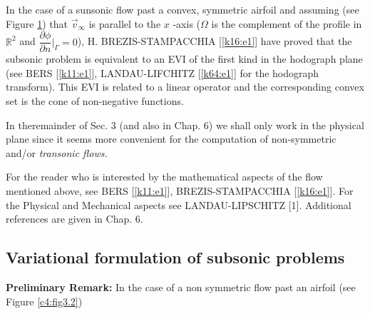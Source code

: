 \begin{remark}\label{c4:rem3.1}%
In the case of a sunsonic flow past a convex, symmetric airfoil and
assuming (see Figure \ref{c4:fig3.1}) that $\vec{v}_\infty$ is
parallel to the $x$ 
-axis ($\Omega$ is the complement of the profile in $\mathbb{R}^2$ and
$\dfrac{\partial \phi}{\partial n}|_\Gamma = 0$),
H. BREZIS-STAMPACCHIA [\ref{k16:e1}] have proved that the subsonic problem is
equivalent to an EVI of the first kind in the hodograph plane (see
BERS [\ref{k11:e1}], LANDAU-LIFCHITZ [\ref{k64:e1}] for the hodograph
transform). This EVI 
is related to a linear operator and the corresponding convex set is
the cone of non-negative functions. 

\setcounter{figure}{0}
\begin{figure}[H]
\caption{}\label{c4:fig3.1}
\end{figure}


In the\pageoriginale remainder of Sec. 3 (and also in Chap. 6) we
shall only work in the physical plane since it seems more convenient
for the computation of non-symmetric and/or \textit{transonic flows.} 
\end{remark}

For the reader who is interested by the mathematical aspects of the
flow mentioned above, see BERS [\ref{k11:e1}], BREZIS-STAMPACCHIA
[\ref{k16:e1}]. For the 
Physical and Mechanical aspects see LANDAU-LIPSCHITZ [1]. Additional
references are given in Chap. 6.  

\subsection{Variational formulation of subsonic problems}\label{c4:ss3.2}

\textbf{Preliminary Remark:} In the case of a non symmetric flow past
an airfoil (see Figure \ref{c4:fig3.2}) 

